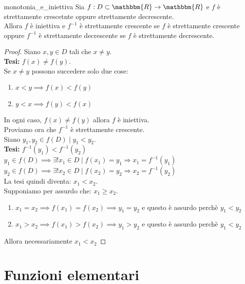 \documentclass[12pt]{report}
\newcounter{theorem}
\begin{document}
	\begin{theorem}{}{monotonia_e_iniettiva}
		Sia $f: D \subset \mathbbm{R} \to \mathbbm{R}$ e $f$ è strettamente crescetnte oppure strettamente decrescente. \\
		Allora $f$ è iniettiva e $f^{-1}$ è strettamente crescente se $f$ è strettamente crescente oppure $f^{-1}$ è strettamente decrescente se $f$ è strettamente decrescente.
		\begin{proof}
			Siano $x, y \in D$ tali che $x \neq y$. \\
			\textbf{Tesi:} $f(x) \neq f(y)$. \\
			Se $x \neq y$ possono succedere solo due cose:
			\begin{enumerate}
				\item $x < y \implies f(x) < f(y)$
				\item $y < x \implies f(y) < f(x)$
			\end{enumerate}
			In ogni caso, $f(x) \neq f(y)$ allora $f$ è iniettiva. \\
			Proviamo ora che $f^{-1}$ è strettamente crescente. \\
			Siano $y_1, y_2 \in f(D) \mid y_1 < y_2$. \\
			\textbf{Tesi:} $f^{-1}(y_1) < f^{-1}(y_2)$ \\
			$y_1 \in f(D) \implies \exists! x_1 \in D \mid f(x_1) = y_1 \Rightarrow x_1 = f^{-1}(y_1)$ \\
			$y_2 \in f(D) \implies \exists! x_2 \in D \mid f(x_2) = y_2 \Rightarrow x_2 = f^{-1}(y_2)$ \\
			La tesi quindi diventa: $x_1 < x_2$.  \\
			Supponiamo per assurdo che: $x_1 \geq x_2$.
			\begin{enumerate}
				\item $x_1 = x_2 \implies f(x_1) = f(x_2) \implies y_1 = y_2$ e questo è assurdo perchè $y_1 < y_2$
				\item $x_1 > x_2 \implies f(x_1) > f(x_2) \implies y_1 > y_2$ e questo è assurdo perchè $y_1 < y_2$
			\end{enumerate}
			Allora necessariamente $x_1 < x_2$
		\end{proof}
	\end{theorem}
	\section{Funzioni elementari}
\end{document}
